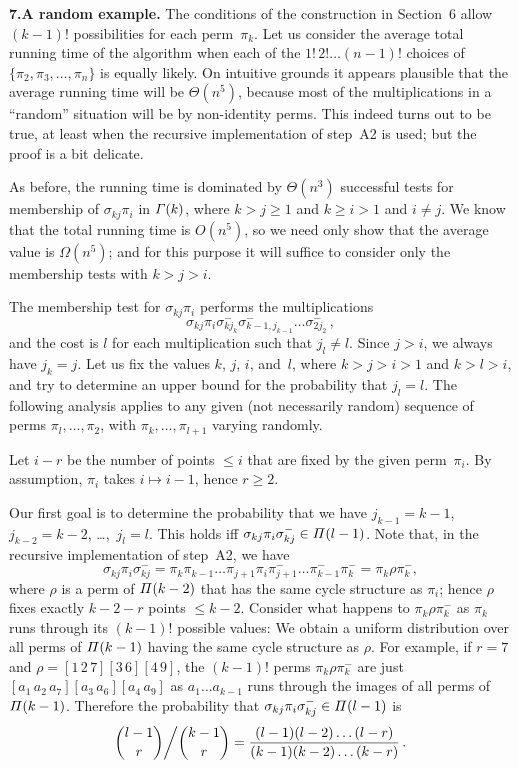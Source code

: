 \medskip
\noindent
{\bf 7.\enspace A random example.}\enspace
 The conditions of the construction in Section~6 allow
$(k-1)!$ possibilities for each perm~$\pi_k$. Let us consider the average
total running time of the algorithm when each of the $1!\,2!\ldots(n-1)!$
choices of $\{\pi_2,\pi_3,\ldots,\pi_n\}$ is equally likely.
On intuitive grounds it appears plausible that the average running time
will be $\Theta(n^5)$, because most of the multiplications in a ``random''
situation will be by non-identity perms. This indeed turns out to be true,
at least when the recursive implementation of step~A2 is used;
but the proof is a bit delicate.

As before, the running time is dominated by $\Theta(n^3)$ successful tests for
membership of $\sigma_{kj}\pi_i$ in ${\mit\Gamma}(k)$, where $k>j\ge1$ and
$k\ge i>1$ and $i\ne j$. We know that the total running time is $O(n^5)$, so
we need only show that the average value is $\Omega(n^5)$; and for this
purpose it will suffice to consider only the membership tests with $k>j>i$.

The membership test for $\sigma_{kj}\pi_i$ performs the multiplications
$$\sigma_{kj}\pi_i\sigma_{kj_k}^-\sigma_{k-1,j_{k-1}}^-\ldots
\sigma_{2j_2}^-\,,$$
and the cost is $l$ for each multiplication such that $j_l\ne l$. Since $j>i$,
we always have $j_k=j$. Let us fix the values $k$, $j$, $i$, and~$l$, where
$k>j>i>1$ and $k>l>i$, and try
to determine an upper bound for the probability that $j_l=l$. The
following analysis applies to any given (not necessarily random)
sequence of perms $\pi_l,\ldots,\pi_2$, with $\pi_k,\ldots,\pi_{l+1}$
varying randomly.

Let $i-r$ be the number of points $\le i$ that are
fixed by the given perm~$\pi_i$. By assumption, $\pi_i$ takes $i\mapsto i-1$,
hence $r\ge2$.

Our first goal is to determine the probability that we have
$j_{k-1}=k-1$, $j_{k-2}=k-2$, \dots,~$j_l=l$. This holds iff
$\sigma_{kj}\pi_i\sigma_{kj}^-\in{\mit\Pi}(l-1)$. Note that,
in the recursive implementation of step~A2, we have
$$\sigma_{kj}\pi_i\sigma_{kj}^-=
\pi_k\pi_{k-1}\ldots\pi_{j+1}\pi_i\pi_{j+1}^-\ldots\pi_{k-1}^-\pi_k^-
=\pi_k\rho\pi_k^-,$$
where $\rho$ is a perm of ${\mit\Pi}(k-2)$ that has the same cycle structure
as $\pi_i$; hence $\rho$ fixes exactly $k-2-r$ points $\le k-2$. Consider
what happens to $\pi_k\rho\pi_k^-$ as $\pi_k$ runs through its $(k-1)!$
possible values: We obtain a uniform distribution
over all perms of ${\mit\Pi}(k-1)$ having the same cycle structure as $\rho$.
For example, if $r=7$ and $\rho=[1\,2\,7][3\,6][4\,9]$, the $(k-1)!$
perms $\pi_k\rho\pi_k^-$ are just $[a_1\,a_2\,a_7][a_3\,a_6][a_4\,a_9]$ as
$a_1\ldots a_{k-1}$ runs through the images of all perms of ${\mit\Pi}(k-1)$.
Therefore the probability that $\sigma_{kj}\pi_i\sigma_{kj}^-\in{\mit\Pi}(l-1)$
is
$${l-1\choose r}\bigg/{k-1\choose r}={(l-1)(l-2)\ldots(l-r)\over
 (k-1)(k-2)\ldots(k-r)}\,.$$

